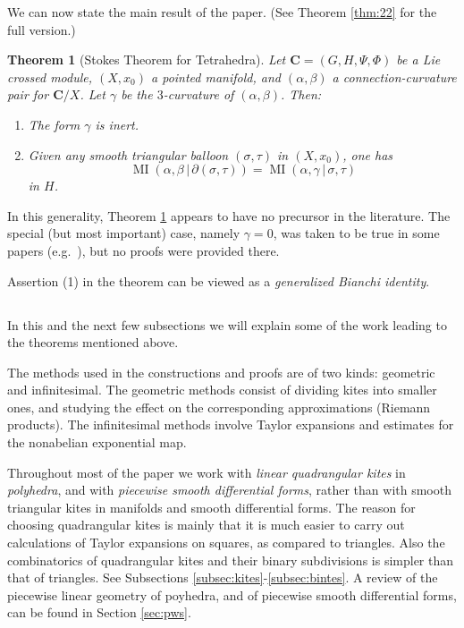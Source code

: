 \documentclass[10pt, a4paper]{amsart}
\newtheorem{thm}[equation]{Theorem}
\theoremstyle{definition}
\numberwithin{equation}{section}
\newcommand{\opn}{\operatorname}
\newcommand{\mbf}[1]{\mathbf{#1}}
\renewcommand{\vert}{\, | \,}
\begin{document}
We can now state the main result of the paper. (See Theorem \ref{thm:22} for the
full version.)

\begin{thm}[Stokes Theorem for Tetrahedra] \label{thm:20}
Let $\mbf{C} = (G, H, \Psi, \Phi)$
be a Lie crossed module, $(X, x_0)$ a pointed manifold, and
$(\alpha, \beta)$ a connection-curvature pair for $\mbf{C} / X$.
Let $\gamma$ be the $3$-curvature of $(\alpha, \beta)$. Then:
\begin{enumerate}
\item The form $\gamma$ is inert.
\item Given any smooth triangular balloon 
$(\sigma, \tau)$ in $(X, x_0)$, one has
\[ \opn{MI} (\alpha, \beta \vert \partial(\sigma, \tau)) =
\opn{MI} (\alpha, \gamma \vert \sigma, \tau) \]
in $H$.
\end{enumerate}
\end{thm}

In this generality, Theorem \ref{thm:20} appears to have no precursor
in the literature. The special (but most important) case, namely
$\gamma = 0$, was taken to be true in some papers (e.g.\ \cite{Ko, BS}), but
no proofs were provided there. 

Assertion (1) in the theorem can be viewed as a {\em generalized Bianchi
identity}. 


\subsection{} \label{subsec:methods}
In this and the next few subsections we will explain some of the work
leading to the theorems mentioned above.

The methods used in the constructions and proofs are of two kinds: geometric
and infinitesimal. The geometric methods consist of dividing kites into smaller
ones, and studying the effect on the corresponding approximations (Riemann
products). The infinitesimal methods involve Taylor expansions and estimates
for the nonabelian exponential map. 

Throughout most of the paper we work with {\em linear quadrangular kites}
in {\em polyhedra}, and with {\em piecewise smooth differential forms},
rather than with smooth triangular kites in manifolds and smooth differential
forms. The reason for choosing quadrangular kites is mainly that it is much
easier to carry out calculations of Taylor expansions on squares, as compared to
triangles. Also the combinatorics of quadrangular kites and their binary
subdivisions is simpler than that of triangles. See Subsections 
\ref{subsec:kites}-\ref{subsec:bintes}. A review of the piecewise linear
geometry of poyhedra, and of piecewise smooth differential forms, can be found
in Section \ref{sec:pws}.
\end{document}
